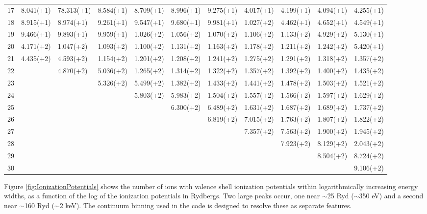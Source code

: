 \begin{table}
\begin{center}
\begin{tabular}{lllllllllll}
17& 8.041(+1)& 78.313(+1)& 8.584(+1)& 8.709(+1)& 8.996(+1)& 9.275(+1)&
4.017(+1)& 4.199(+1)& 4.094(+1)& 4.255(+1)\\
18& 8.915(+1)& 8.974(+1)& 9.261(+1)& 9.547(+1)& 9.680(+1)& 9.981(+1)&
1.027(+2)& 4.462(+1)& 4.652(+1)& 4.549(+1)\\
19& 9.466(+1)& 9.893(+1)& 9.959(+1)& 1.026(+2)& 1.056(+2)& 1.070(+2)&
1.106(+2)& 1.133(+2)& 4.929(+2)& 5.130(+1)\\
20& 4.171(+2)& 1.047(+2)& 1.093(+2)& 1.100(+2)& 1.131(+2)& 1.163(+2)&
1.178(+2)& 1.211(+2)& 1.242(+2)& 5.420(+1)\\
21& 4.435(+2)& 4.593(+2)& 1.154(+2)& 1.201(+2)& 1.208(+2)& 1.241(+2)&
1.275(+2)& 1.291(+2)& 1.318(+2)& 1.357(+2)\\
22&& 4.870(+2)& 5.036(+2)& 1.265(+2)& 1.314(+2)& 1.322(+2)& 1.357(+2)&
1.392(+2)& 1.400(+2)& 1.435(+2)\\
23&&& 5.326(+2)& 5.499(+2)& 1.382(+2)& 1.433(+2)& 1.441(+2)& 1.478(+2)&
1.503(+2)& 1.521(+2)\\
24&&&& 5.803(+2)& 5.983(+2)& 1.504(+2)& 1.557(+2)& 1.566(+2)& 1.597(+2)&
1.629(+2)\\
25&&&&& 6.300(+2)& 6.489(+2)& 1.631(+2)& 1.687(+2)& 1.689(+2)& 1.737(+2)\\
26&&&&&& 6.819(+2)& 7.015(+2)& 1.763(+2)& 1.807(+2)& 1.822(+2)\\
27&&&&&&& 7.357(+2)& 7.563(+2)& 1.900(+2)& 1.945(+2)\\
28&&&&&&&& 7.923(+2)& 8.129(+2)& 2.043(+2)\\
29&&&&&&&&& 8.504(+2)& 8.724(+2)\\
30&&&&&&&&&& 9.106(+2)\\
\hline
\end{tabular}
\end{center}
\end{table}

Figure \ref{fig:IonizationPotentials} shows the number of ions with valence shell ionization potentials
within logarithmically increasing energy widths, as a function of the log
of the ionization potentials in Rydbergs.  Two large peaks occur, one near
$\sim $25 Ryd ($\sim $350 eV) and a second near $\sim $160 Ryd ($\sim $2 keV).
The continuum binning used in the code is designed to resolve these as
separate features.

